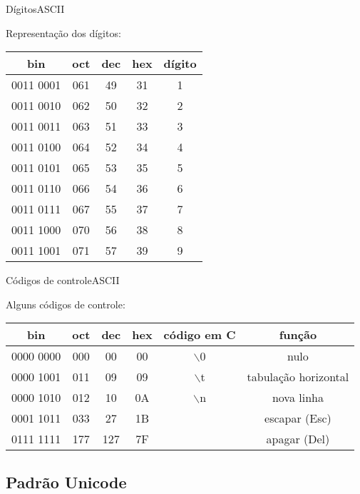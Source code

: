 \begin{frame}{Dígitos}{ASCII}

  Representação dos dígitos:\bigskip
  
\begin{center}
  \begin{tabular}{|c|c|c|c|c|}\hline
    \bf bin &	\bf oct &\bf	dec &\bf	hex &\bf dígito\\\hline
    0011 0001 &	061 &	49 &	31 &	1  \\\hline
    0011 0010 &	062 &	50 &	32 &	2 \\\hline
    0011 0011 &	063 &	51 &	33 &	3 \\\hline
    0011 0100 &	064 &	52 &	34 &	4 \\\hline
    0011 0101 &	065 &	53 &	35 &	5 \\\hline
    0011 0110 &	066 &	54 &	36 &	6 \\\hline
    0011 0111 &	067 &	55 &	37 &	7 \\\hline
    0011 1000 &	070 &	56 &	38 &	8 \\\hline
    0011 1001 &	071 &	57 &	39 &	9 \\\hline
  \end{tabular}
\end{center}

\end{frame}

\begin{frame}{Códigos de controle}{ASCII}
  
  Alguns códigos de controle:\bigskip
  
  \begin{tabular}{|c|c|c|c|c|c|}\hline
    \bf bin &	\bf oct &\bf	dec &\bf	hex &\bf código	em C & \bf função \\\hline
    0000 0000 &	000 &	00 &	00 	& 	 	$\backslash$0    &	nulo  \\\hline
    0000 1001 &	011 &	09 &	09 	& 	$\backslash$t & tabulação horizontal \\\hline
    0000 1010 &	012 &	10 &	0A 	&	$\backslash$n & nova linha \\\hline
    0001 1011 &	033 &	27 &	1B 	& 	              & escapar (Esc)  \\\hline
    0111 1111 &	177 &	127 &	7F 	& 	 	      & apagar (Del) \\\hline
  \end{tabular}

\end{frame}

\subsection{Padrão Unicode}

